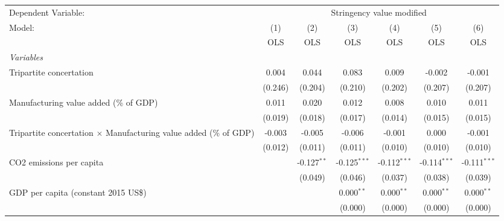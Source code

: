 
\begingroup
\centering
\begin{tabular}{lcccccc}
   \toprule
   Dependent Variable: & \multicolumn{6}{c}{Stringency value modified}\\
   Model:                                                                   & (1)     & (2)           & (3)            & (4)            & (5)            & (6)\\  
                                                                            &  OLS    & OLS           & OLS            & OLS            & OLS            & OLS\\  
   \midrule
   \emph{Variables}\\
   Tripartite concertation                                                  & 0.004   & 0.044         & 0.083          & 0.009          & -0.002         & -0.001\\   
                                                                            & (0.246) & (0.204)       & (0.210)        & (0.202)        & (0.207)        & (0.207)\\   
   Manufacturing value added (\% of GDP)                                    & 0.011   & 0.020         & 0.012          & 0.008          & 0.010          & 0.011\\   
                                                                            & (0.019) & (0.018)       & (0.017)        & (0.014)        & (0.015)        & (0.015)\\   
   Tripartite concertation $\times$ Manufacturing value added (\% of GDP)   & -0.003  & -0.005        & -0.006         & -0.001         & 0.000          & -0.001\\   
                                                                            & (0.012) & (0.011)       & (0.011)        & (0.010)        & (0.010)        & (0.010)\\   
   CO2 emissions per capita                                                 &         & -0.127$^{**}$ & -0.125$^{***}$ & -0.112$^{***}$ & -0.114$^{***}$ & -0.111$^{***}$\\   
                                                                            &         & (0.049)       & (0.046)        & (0.037)        & (0.038)        & (0.039)\\   
   GDP per capita (constant 2015 US\$)                                      &         &               & 0.000$^{**}$   & 0.000$^{**}$   & 0.000$^{**}$   & 0.000$^{**}$\\   
                                                                            &         &               & (0.000)        & (0.000)        & (0.000)        & (0.000)\\   

\end{tabular}
